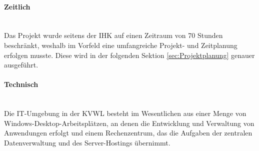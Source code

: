\paragraph{Zeitlich} ~\\
\label{p:Randbedingungen:Zeitlich}
Das Projekt wurde seitens der IHK auf einen Zeitraum von 70 Stunden beschränkt, weshalb im Vorfeld eine umfangreiche Projekt- und Zeitplanung erfolgen musste. Diese wird in der folgenden Sektion \ref{sec:Projektplanung} genauer ausgeführt.

\paragraph{Technisch} ~\\
\label{p:Randbedingungen:Technisch}
Die IT-Umgebung in der \ac{KVWL} besteht im Wesentlichen aus einer Menge von Windows-Desktop-Arbeitsplätzen, an denen die Entwicklung und Verwaltung von Anwendungen erfolgt und einem Rechenzentrum, das die Aufgaben der zentralen Datenverwaltung und des Server-Hostings übernimmt.